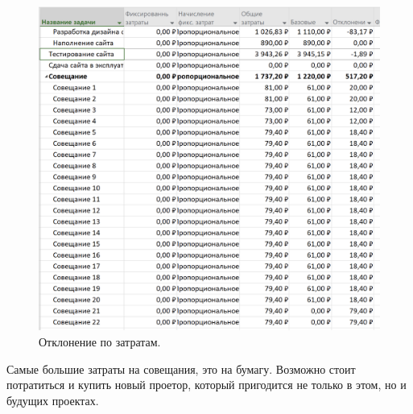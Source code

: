 \documentclass[a4paper,14pt]{extreport} %
\begin{document}
\begin{enumerate}
\begin{figure}[H]
  \centering
  \caption{Отклонение по затратам. }
  \includegraphics[scale=0.5]{20}
\end{figure}

Самые большие затраты на совещания, это на бумагу. Возможно стоит потратиться и купить новый проетор, который пригодится не только в этом, но и будущих проектах.


\end{enumerate}
\end{document}
